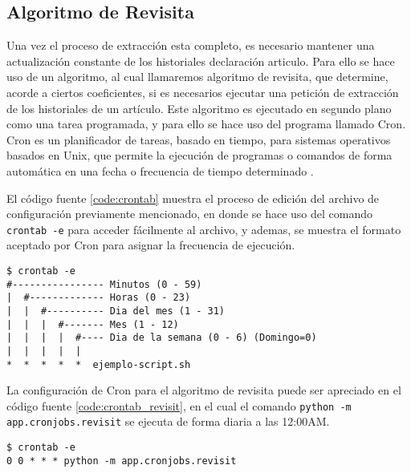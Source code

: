 \subsection{Algoritmo de Revisita}

Una vez el proceso de extracción esta completo,
es necesario mantener una actualización constante de los historiales declaración articulo.
Para ello se hace uso de un algoritmo, al cual llamaremos algoritmo de revisita, que determine, acorde a ciertos coeficientes, si
es necesarios ejecutar una petición de extracción de los historiales de un artículo.
Este algoritmo es ejecutado en segundo plano como una tarea programada, y para ello
se hace uso del programa llamado Cron.
Cron es un planificador de tareas, basado en tiempo, para sistemas operativos basados en Unix, que permite la ejecución de programas o comandos de forma automática en una fecha o frecuencia de tiempo determinado \cite{24}.

El código fuente \ref{code:crontab} muestra el proceso de edición del archivo de configuración previamente mencionado, en donde se hace uso del comando \texttt{crontab -e}
para acceder fácilmente al archivo, y ademas, se muestra el formato aceptado por Cron
para asignar la frecuencia de ejecución.

\begin{minipage}{\linewidth}
\begin{lstlisting}[caption={Edición del archivo de configuración de Cron},breaklines=true,label={code:crontab}]
$ crontab -e
#---------------- Minutos (0 - 59)
|  #------------- Horas (0 - 23)
|  |  #---------- Dia del mes (1 - 31)
|  |  |  #------- Mes (1 - 12)
|  |  |  |  #---- Dia de la semana (0 - 6) (Domingo=0)
|  |  |  |  |
*  *  *  *  *  ejemplo-script.sh
\end{lstlisting}
\end{minipage}

La configuración de Cron para el algoritmo de revisita puede ser apreciado en el código fuente \ref{code:crontab_revisit}, en el cual el comando \texttt{python -m app.cronjobs.revisit} se ejecuta de forma diaria a las 12:00AM.

\begin{minipage}{\linewidth}
\begin{lstlisting}[caption={Edición del archivo de configuración de Cron},breaklines=true,label={code:crontab_revisit}]
$ crontab -e
0 0 * * * python -m app.cronjobs.revisit
\end{lstlisting}
\end{minipage}

